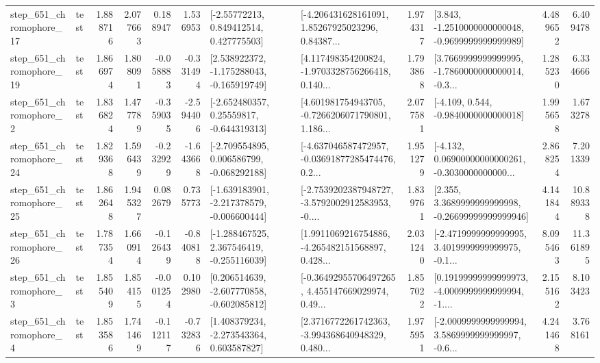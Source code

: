 \begin{tabular}{llrrrrllrlrr}
  step\_651\_chromophore\_17 &      test &      1.888716 &    2.077663 &      0.188947 &  1.536953 &     [-2.55772213, 0.849412514, 0.427775503] &  [-4.206431628161091, 1.85267925023296, 0.84387... &       1.974317 &  [3.843, -1.2510000000000048, -0.9699999999999989] &            4.489652 &          6.409478 \\
  step\_651\_chromophore\_19 &      test &      1.866974 &    1.808091 &     -0.058883 & -0.331494 &   [2.538922372, -1.175288043, -0.165919749] &  [4.117498354200824, -1.9703328756266418, 0.140... &       1.793868 &  [3.7669999999999995, -1.7860000000000014, -0.3... &            1.285230 &          6.334666 \\
   step\_651\_chromophore\_2 &      test &      1.836824 &    1.477789 &     -0.359035 & -2.594406 &    [-2.652480357, 0.25559817, -0.644319313] &  [4.601981754943705, -0.7266206071790801, 1.186... &       2.077581 &               [-4.109, 0.544, -0.9840000000000018] &            1.995658 &          1.673278 \\
  step\_651\_chromophore\_24 &      test &      1.829368 &    1.596439 &     -0.232929 & -1.643668 &   [-2.709554895, 0.006586799, -0.068292188] &  [-4.637046587472957, -0.03691877285474476, 0.2... &       1.951279 &  [-4.132, 0.06900000000000261, -0.3030000000000... &            2.868254 &          7.201339 \\
  step\_651\_chromophore\_25 &      test &      1.862648 &    1.945327 &      0.082679 &  0.735773 &  [-1.639183901, -2.217378579, -0.006600444] &  [-2.7539202387948727, -3.5792002912583953, -0.... &       1.839761 &  [2.355, 3.3689999999999998, -0.26699999999999946] &            4.141844 &         10.889338 \\
  step\_651\_chromophore\_26 &      test &      1.787354 &    1.660914 &     -0.126439 & -0.840818 &   [-1.288467525, 2.367546419, -0.255116039] &  [1.9911069216754886, -4.265482151568897, 0.428... &       2.031240 &  [-2.4719999999999995, 3.4019999999999975, -0.1... &            8.095463 &         11.361895 \\
   step\_651\_chromophore\_3 &      test &      1.855409 &    1.854155 &     -0.001254 &  0.102980 &   [0.206514639, -2.607770858, -0.602085812] &  [-0.36492955706497265, 4.455147669029974, 0.49... &       1.857022 &  [0.19199999999999973, -4.0009999999999994, -1.... &            2.155162 &          8.103423 \\
   step\_651\_chromophore\_4 &      test &      1.853586 &    1.741469 &     -0.112117 & -0.732836 &    [1.408379234, -2.273543364, 0.603587827] &  [2.3716772261742363, -3.994368640948329, 0.480... &       1.975951 &  [-2.0009999999999994, 3.5869999999999997, -0.6... &            4.241468 &          3.768161 \\

\end{tabular}
